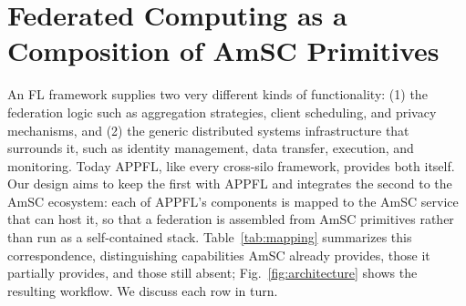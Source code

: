 \documentclass[conference]{IEEEtran}
\begin{document}


\section{Federated Computing as a Composition of AmSC Primitives}
\label{sec:mapping}
An FL framework supplies two very different kinds of functionality: (1) the federation logic such as aggregation strategies, client scheduling, and privacy mechanisms, and (2) the generic distributed systems infrastructure that surrounds it, such as identity management, data transfer, execution, and monitoring. Today APPFL, like every cross-silo framework, provides both itself. Our design aims to keep the first with APPFL and integrates the second to the AmSC ecosystem: each of APPFL's components is mapped to the AmSC service that can host it, so that a federation is assembled from AmSC primitives rather than run as a self-contained stack. Table~\ref{tab:mapping} summarizes this correspondence, distinguishing capabilities AmSC already provides, those it partially provides, and those still absent; Fig.~\ref{fig:architecture} shows the resulting workflow. We discuss each row in turn.
\end{document}
